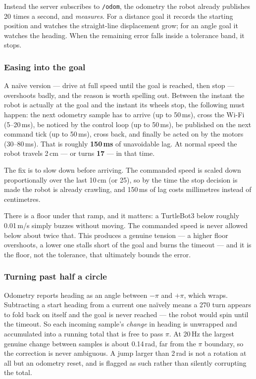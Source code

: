 \documentclass[11pt,a4paper]{article}
\newcommand{\code}[1]{\texttt{#1}}
\begin{document}
Instead the server subscribes to \code{/odom}, the odometry the robot already
publishes 20 times a second, and \emph{measures}. For a distance goal it records
the starting position and watches the straight-line displacement grow; for an
angle goal it watches the heading. When the remaining error falls inside a
tolerance band, it stops.

\subsubsection{Easing into the goal}
A na\"ive version --- drive at full speed until the goal is reached, then stop
--- overshoots badly, and the reason is worth spelling out. Between the instant
the robot is actually at the goal and the instant its wheels stop, the following
must happen: the next odometry sample has to arrive (up to 50\,ms), cross the
Wi-Fi (5--20\,ms), be noticed by the control loop (up to 50\,ms), be published on
the next command tick (up to 50\,ms), cross back, and finally be acted on by the
motors (30--80\,ms). That is roughly \textbf{150\,ms} of unavoidable lag. At
normal speed the robot travels 2\,cm --- or turns \textbf{17\textdegree} --- in
that time.

The fix is to slow down before arriving. The commanded speed is scaled down
proportionally over the last 10\,cm (or 25\textdegree), so by the time the stop
decision is made the robot is already crawling, and 150\,ms of lag costs
millimetres instead of centimetres.

There is a floor under that ramp, and it matters: a TurtleBot3 below roughly
0.01\,m/s simply buzzes without moving. The commanded speed is never allowed
below about twice that. This produces a genuine tension --- a higher floor
overshoots, a lower one stalls short of the goal and burns the timeout --- and it
is the floor, not the tolerance, that ultimately bounds the error.

\subsubsection{Turning past half a circle}
Odometry reports heading as an angle between $-\pi$ and $+\pi$, which wraps.
Subtracting a start heading from a current one na\"ively means a
270\textdegree{} turn appears to fold back on itself and the goal is never
reached --- the robot would spin until the timeout. So each incoming sample's
\emph{change} in heading is unwrapped and accumulated into a running total that
is free to pass $\pi$. At 20\,Hz the largest genuine change between samples is
about 0.14\,rad, far from the $\pi$ boundary, so the correction is never
ambiguous. A jump larger than 2\,rad is not a rotation at all but an odometry
reset, and is flagged as such rather than silently corrupting the total.
\end{document}
